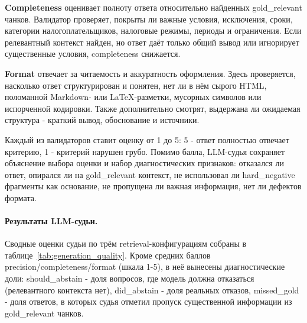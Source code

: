 \documentclass[a4paper,12pt]{article}
\begin{document}
\textbf{Completeness} оценивает полноту ответа относительно найденных gold\_relevant чанков. Валидатор проверяет, покрыты ли важные условия, исключения, сроки, категории налогоплательщиков, налоговые режимы, периоды и ограничения. Если релевантный контекст найден, но ответ даёт только общий вывод или игнорирует существенные условия, completeness снижается.

\textbf{Format} отвечает за читаемость и аккуратность оформления. Здесь проверяется, насколько ответ структурирован и понятен, нет ли в нём сырого HTML, поломанной Markdown- или LaTeX-разметки, мусорных символов или испорченной кодировки. Также дополнительно смотрят, выдержана ли ожидаемая структура - краткий вывод, обоснование и источники.

Каждый из валидаторов ставит оценку от 1 до 5: 5 - ответ полностью отвечает критерию, 1 - критерий нарушен грубо. Помимо балла, LLM-судья сохраняет объяснение выбора оценки и набор диагностических признаков: отказался ли ответ, опирался ли на gold\_relevant контекст, не использовал ли hard\_negative фрагменты как основание, не пропущена ли важная информация, нет ли дефектов формата.

\paragraph{Результаты LLM-судьи.}

Сводные оценки судьи по трём retrieval-конфигурациям собраны в таблице~\ref{tab:generation_quality}. Кроме средних баллов precision/completeness/format (шкала 1-5), в неё вынесены диагностические доли: should\_abstain - доля вопросов, где модель должна отказаться (релевантного контекста нет), did\_abstain - доля реальных отказов, missed\_gold - доля ответов, в которых судья отметил пропуск существенной информации из gold\_relevant чанков.

\begin{table}[H]
\centering
\caption{Качество генерации по оценке LLM-судьи (superhard, $n=171$, судья gpt-oss-20b)}
\label{tab:generation_quality}
\end{table}
\FloatBarrier
\end{document}
